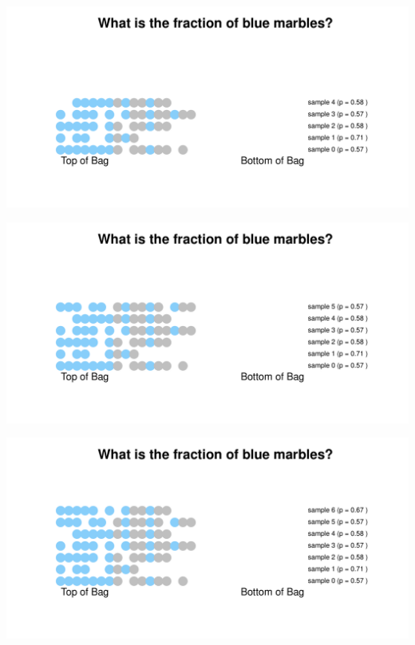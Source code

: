 \documentclass[aspectratio=169]{beamer}
\theoremstyle{principle}
\begin{document}
\begin{frame}
\begin{center}
\includegraphics[scale=0.57]{bias_sample_4.pdf}
\end{center}
\end{frame}

\begin{frame}
\begin{center}
\includegraphics[scale=0.57]{bias_sample_5.pdf}
\end{center}
\end{frame}

\begin{frame}
\begin{center}
\includegraphics[scale=0.57]{bias_sample_6.pdf}
\end{center}
\end{frame}
\end{document}
